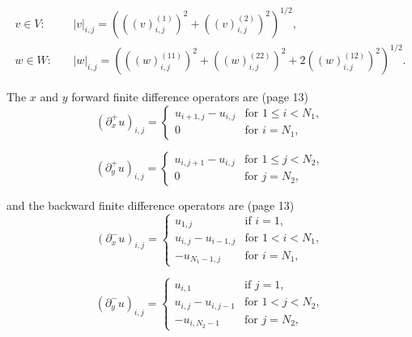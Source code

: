 \documentclass{article}
\begin{document}
\begin{equation}
    \begin{aligned}
    v \in V : \quad &|v|_{i,j} = \left( \left( (v)_{i,j}^{(1)} \right)^{2} + \left( (v)_{i,j}^{(2)} \right)^{2} \right)^{1/2}, \\
    w \in W : \quad &|w|_{i,j} = \left( \left( (w)_{i,j}^{(11)} \right)^{2} + \left( (w)_{i,j}^{(22)} \right)^{2} + 2 \left( (w)_{i,j}^{(12)} \right)^{2} \right)^{1/2}.
    \end{aligned}
\end{equation}



The $x$ and $y$ forward finite difference operators are (page 13)
\begin{equation}
(\partial_x^+ u)_{i,j} =
\begin{cases}
u_{i+1,j} - u_{i,j} & \text{for } 1 \leq i < N_1, \\
0 & \text{for } i = N_1,
\end{cases}
\end{equation}

\begin{equation}
(\partial_y^+ u)_{i,j} =
\begin{cases}
u_{i,j+1} - u_{i,j} & \text{for } 1 \leq j < N_2, \\
0 & \text{for } j = N_2,
\end{cases}
\end{equation}

and the backward finite difference operators are (page 13)
\begin{equation}
    (\partial_x^- u)_{i,j} = 
    \begin{cases}
    u_{1,j} & \text{if } i = 1, \\
    u_{i,j} - u_{i-1,j} & \text{for } 1 < i < N_1, \\
    -u_{N_1-1,j} & \text{for } i = N_1,
    \end{cases}
\end{equation}
    
\begin{equation}
    (\partial_y^- u)_{i,j} = 
    \begin{cases}
    u_{i,1} & \text{if } j = 1, \\
    u_{i,j} - u_{i,j-1} & \text{for } 1 < j < N_2, \\
    -u_{i,N_2-1} & \text{for } j = N_2,
    \end{cases}
\end{equation}
\end{document}
